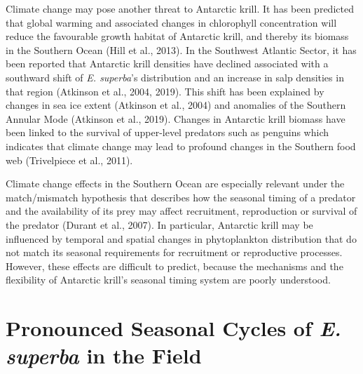 Climate change may pose another threat to Antarctic krill. It has been
predicted that global warming and associated changes in chlorophyll
concentration will reduce the favourable growth habitat of Antarctic krill, and
thereby its biomass in the Southern Ocean (Hill et al., 2013). In the Southwest
Atlantic Sector, it has been reported that Antarctic krill densities have
declined associated with a southward shift of \textit{E. superba}'s
distribution and an increase in salp densities in that region (Atkinson et al.,
2004, 2019). This shift has been explained by changes in sea ice extent
(Atkinson et al., 2004) and anomalies of the Southern Annular Mode (Atkinson et
al., 2019). Changes in Antarctic krill biomass have been linked to the survival
of upper-level predators such as penguins which indicates that climate change
may lead to profound changes in the Southern food web (Trivelpiece et al.,
2011).

Climate change effects in the Southern Ocean are especially relevant under the
match/mismatch hypothesis that describes how the seasonal timing of a predator
and the availability of its prey may affect recruitment, reproduction or
survival of the predator (Durant et al., 2007). In particular, Antarctic krill
may be influenced by temporal and spatial changes in phytoplankton distribution
that do not match its seasonal requirements for recruitment or reproductive
processes. However, these effects are difficult to predict, because the
mechanisms and the flexibility of Antarctic krill's seasonal timing system are
poorly understood.

\section{Pronounced Seasonal Cycles of \textit{E. superba} in the Field}

